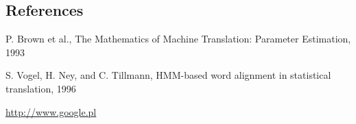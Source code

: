 \documentclass[final]{beamer}
\begin{document}
\begin{frame}[t]
\begin{multicols}{3}

\subsection{References}

\begin{thebibliography}{99}

 P. Brown et al., The Mathematics of Machine Translation: Parameter Estimation, 1993

 S. Vogel, H. Ney, and C. Tillmann, HMM-based word alignment in statistical translation, 1996

 \url{http://www.google.pl}

\end{thebibliography}

\end{multicols}

\end{frame}
\end{document}
